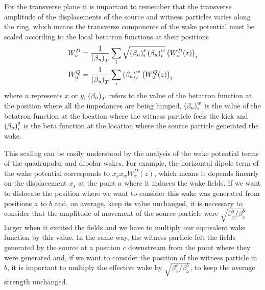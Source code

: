     For the transverse plane it is important to remember that the transverse amplitude of the displacements of the source and witness particles varies along the ring, which means the transverse components of the wake potential must be scaled according to the local betatron functions at their positions
    \begin{align}\label{eq:scaling_transverse_general}\nonumber
        W_u^D &=\frac{1}{\left(\beta_u\right)_T} \sum_i \sqrt{\left(\beta_u\right)_i^s\left(\beta_u\right)_i^w}\left(W_u^D(z)\right)_i \\
        W_u^Q &=\frac{1}{\left(\beta_u\right)_T} \sum_i \left(\beta_u\right)_i^w\left(W_u^Q(z)\right)_i
    \end{align}
    where $u$ represents $x$ or $y$, $\left(\beta_u\right)_T$ refers to the value of the betatron function at the position where all the impedances are being lumped, $\left(\beta_u\right)_i^w$ is the value of the betatron function at the location where the witness particle feels the kick and $\left(\beta_u\right)_i^s$ is the beta function at the location where the source particle generated the wake.

    This scaling can be easily understood by the analysis of the wake potential terms of the quadrupolar and dipolar wakes. For example, the horizontal dipole term of the wake potential corresponds to $x_sx_wW_x^D(z)$, which means it depends linearly on the displacement $x_s$ at the point $a$ where it induces the wake fields. If we want to dislocate the position where we want to consider this wake was generated from positions $a$ to $b$ and, on average, keep its value unchanged, it is necessary to consider that the amplitude of movement of the source particle were $\sqrt{\beta_x^a/\beta_x^b}$ larger when it excited the fields and we have to multiply our equivalent wake function by this value. In the same way, the witness particle felt the fields generated by the source at a position $c$ downstream from the point where they were generated and, if we want to consider the position of the witness particle in $b$, it is important to multiply the effective wake by $\sqrt{\beta_x^c/\beta_x^b}$, to keep the average strength unchanged.


